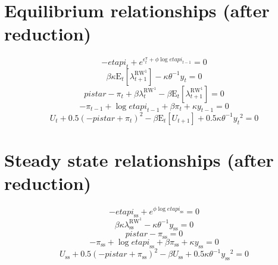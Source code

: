 \section{Equilibrium relationships (after reduction)}

\begin{equation}
-{e\!t\!a\!p\!i}_{t} + e^{\epsilon^{\pi}_{t} + {\phi} {\log{{e\!t\!a\!p\!i}_{t-1}}}} = 0
\end{equation}
\begin{equation}
{\beta} {\kappa} {\mathrm{E}_{t}\left[\lambda^{\mathrm{RW}^{\mathrm{1}}}_{t+1}\right]} - {\kappa} {\theta}^{-1} {y_{t}} = 0
\end{equation}
\begin{equation}
{p\!i\!s\!t\!a\!r} - \pi_{t} + {\beta} {\lambda^{\mathrm{RW}^{\mathrm{1}}}_{t}} - {\beta} {\mathrm{E}_{t}\left[\lambda^{\mathrm{RW}^{\mathrm{1}}}_{t+1}\right]} = 0
\end{equation}
\begin{equation}
-\pi_{t-1} + \log{{e\!t\!a\!p\!i}_{t-1}} + {\beta} {\pi_{t}} + {\kappa} {y_{t-1}} = 0
\end{equation}
\begin{equation}
U_{t} + 0.5\left(-{p\!i\!s\!t\!a\!r} + \pi_{t}\right)^{2} - {\beta} {\mathrm{E}_{t}\left[U_{t+1}\right]} + 0.5{\kappa} {\theta}^{-1} {y_{t}}^{2} = 0
\end{equation}



\section{Steady state relationships (after reduction)}

\begin{equation}
-{e\!t\!a\!p\!i}_\mathrm{ss} + e^{{\phi} {\log{{e\!t\!a\!p\!i}_\mathrm{ss}}}} = 0
\end{equation}
\begin{equation}
{\beta} {\kappa} {\lambda^{\mathrm{RW}^{\mathrm{1}}}_\mathrm{ss}} - {\kappa} {\theta}^{-1} {y_\mathrm{ss}} = 0
\end{equation}
\begin{equation}
{p\!i\!s\!t\!a\!r} - \pi_\mathrm{ss} = 0
\end{equation}
\begin{equation}
-\pi_\mathrm{ss} + \log{{e\!t\!a\!p\!i}_\mathrm{ss}} + {\beta} {\pi_\mathrm{ss}} + {\kappa} {y_\mathrm{ss}} = 0
\end{equation}
\begin{equation}
U_\mathrm{ss} + 0.5\left(-{p\!i\!s\!t\!a\!r} + \pi_\mathrm{ss}\right)^{2} - {\beta} {U_\mathrm{ss}} + 0.5{\kappa} {\theta}^{-1} {y_\mathrm{ss}}^{2} = 0
\end{equation}






